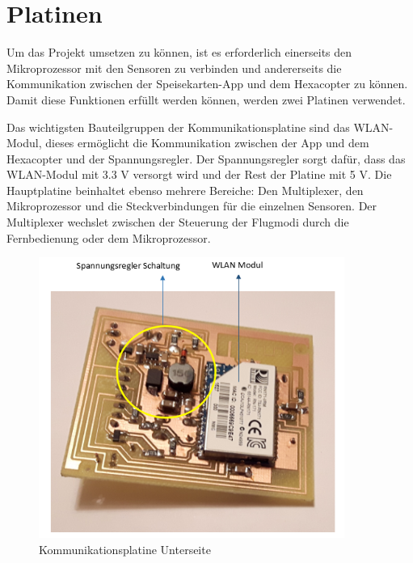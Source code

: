 \section{Platinen}
Um das Projekt umsetzen zu können, ist es erforderlich einerseits den Mikroprozessor mit den Sensoren zu verbinden und andererseits die Kommunikation zwischen der Speisekarten-App und dem Hexacopter zu können. 
Damit diese Funktionen erfüllt werden können, werden zwei Platinen verwendet.

Das wichtigsten Bauteilgruppen der Kommunikationsplatine sind das WLAN-Modul, dieses ermöglicht die Kommunikation zwischen der App und dem Hexacopter und der Spannungsregler. Der Spannungsregler sorgt dafür, dass das WLAN-Modul mit 3.3 V versorgt wird und der Rest der Platine mit 5 V.
Die Hauptplatine beinhaltet ebenso mehrere Bereiche: Den Multiplexer, den Mikroprozessor und die Steckverbindungen für die einzelnen Sensoren.
Der Multiplexer wechslet zwischen der Steuerung der Flugmodi durch die Fernbedienung oder dem Mikroprozessor.

\begin{figure}[tbh]
\begin{centering}
\includegraphics[width = 100mm]{Bilder/WP_Bottom_Beschriftung}
\par\end{centering}
\caption{Kommunikationsplatine Unterseite}
\label{WLAN Platine}
\end{figure}

